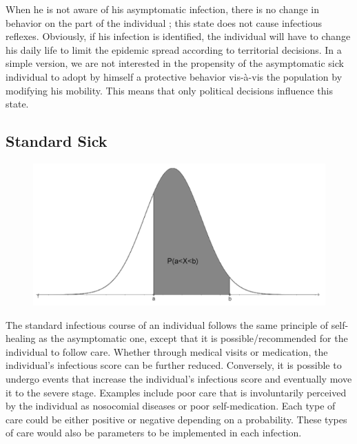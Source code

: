 When he is not aware of his asymptomatic infection, there is no change in behavior on the part of the individual ; this state does not cause infectious reflexes. Obviously, if his infection is identified, the individual will have to change his daily life to limit the epidemic spread according to territorial decisions. In a simple version, we are not interested in the propensity of the asymptomatic sick individual to adopt by himself a protective behavior vis-à-vis the population by modifying his mobility. This means that only political decisions influence this state.\\

\subsection{Standard Sick}

\begin{figure}
  \centering
  \includegraphics[trim = 234 0 184 0, clip, width=\linewidth]{Media/LoiGauss.png}
\end{figure}

The standard infectious course of an individual follows the same principle of self-healing as the asymptomatic one, except that it is possible/recommended for the individual to follow care. Whether through medical visits or medication, the individual's infectious score can be further reduced. Conversely, it is possible to undergo events that increase the individual's infectious score and eventually move it to the severe stage. Examples include poor care that is involuntarily perceived by the individual as nosocomial diseases or poor self-medication. Each type of care could be either positive or negative depending on a probability. These types of care would also be parameters to be implemented in each infection.\\

